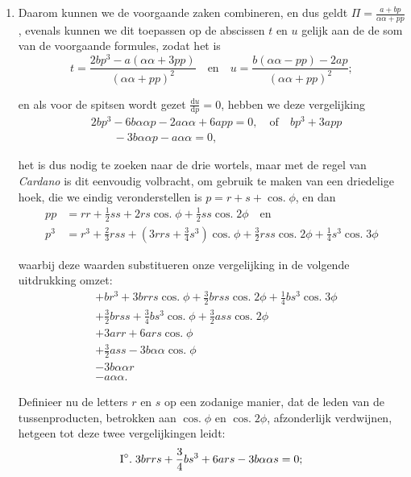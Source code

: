\documentclass[10pt,a4paper]{article}
\newcommand{\switchenum}{\setcounter{enumi}{\arabic{enumi}-1}\switchcolumn}
\DeclareMathOperator{\cosg}{cos.}
\def\D{\mathrm{d}}
\begin{document}
\begin{paracol}{2}
\begin{enumerate}[topsep=1px]
		\switchenum
		\item Daarom kunnen we de voorgaande zaken combineren, en dus geldt $\Pi = \frac{a+bp}{\alpha\alpha+pp}$, evenals kunnen we dit toepassen op de abscissen $t$ en $u$ gelijk aan de de som van de voorgaande formules, zodat het is
		\[
			t = \frac{2bp^3 - a(\alpha \alpha + 3pp)}{(\alpha \alpha + pp)^2} \quad \text{en} \quad u = \frac{b(\alpha \alpha - pp)-2ap}{(\alpha \alpha + pp)^2};
		\]
		\par en als voor de spitsen wordt gezet $\frac{\D u}{\D p}=0$, hebben we deze vergelijking
		\begin{align*}
			&2bp^3-6b\alpha \alpha p -2a \alpha \alpha +6a pp = 0, \quad \text{of} \quad bp^3+3app\\
			&\qquad-3b\alpha \alpha p - a\alpha \alpha = 0,
		\end{align*}
		\par het is dus nodig te zoeken naar de drie wortels, maar met de regel van \textit{Cardano} is dit eenvoudig volbracht, om gebruik te maken van een driedelige hoek, die we eindig veronderstellen is $p=r+s+\cosg \phi$, en dan
		\begin{align*}
			pp & = rr + \frac{1}{2}ss +2rs \cosg\phi + \frac{1}{2}ss \cosg 2\phi \quad \text{en}\\
			p^3 & = r^3+\frac{2}{3}rss + (3rrs+\frac{3}{4}s^3)\cosg \phi + \frac{3}{2} rss \cosg 2\phi+\frac{1}{4}s^3\cosg 3\phi
		\end{align*}
		\par waarbij deze waarden substitueren onze vergelijking in de volgende uitdrukking omzet:
		\begin{align*}
			&+br^3+3brrs \cosg \phi + \frac{3}{2}brss \cosg 2\phi+ \frac{1}{4}bs^3\cosg 3\phi\\
			&+\frac{3}{2}brss + \frac{3}{4}bs^3\cosg \phi + \frac{3}{2}ass \cosg 2\phi\\
			&+3arr + 6ars \cosg \phi\\
			&+\frac{3}{2}ass - 3b\alpha \alpha \cosg \phi\\
			&-3b\alpha \alpha r\\
			&-a \alpha \alpha.
		\end{align*}
		\par Definieer nu de letters $r$ en $s$ op een zodanige manier, dat de leden van de tussenproducten, betrokken aan $\cosg \phi$ en $\cosg 2\phi$, afzonderlijk verdwijnen, hetgeen tot deze twee vergelijkingen leidt:
		\begin{align*}
			\text{I}\degree.\; &3brrs + \frac{3}{4}bs^3+6ars-3b\alpha \alpha s = 0;\\

\end{align*}
\end{enumerate}
\end{paracol}
\end{document}
